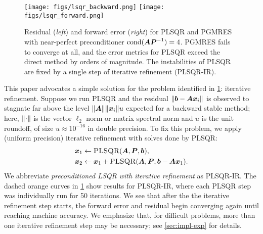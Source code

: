 \documentclass[onefignum,onetabnum,pagebackref,dvipsnames]{siamart220329}
\begin{document}
\begin{figure}[t]
    \centering
    \texttt{[image: figs/lsqr\_backward.png]}
    \texttt{[image: figs/lsqr\_forward.png]}
    \caption{Residual (\emph{left}) and forward error (\emph{right}) for PLSQR and PGMRES with near-perfect preconditioner $\operatorname{cond}(\boldsymbol{A}\boldsymbol{P}^{-1}) = 4$.
    PGMRES fails to converge at all, and the error metrics for PLSQR exceed the direct method by orders of magnitude.
    The instabilities of PLSQR are fixed by a single step of iterative refinement (PLSQR-IR).}
    \label{fig:lsqr}
\end{figure}

This paper advocates a simple solution for the problem identified in \cref{fig:lsqr}: iterative refinement.
Suppose we run PLSQR and the residual $\norm{\vec{b} - \mat{A}\vec{x}_i}$ is observed to stagnate far above the level $\norm{\mat{A}}\norm{\vec{x}_i} u$ expected for a backward stable method; here, $\norm{\cdot}$ is the vector $\ell_2$ norm or matrix spectral norm and $u$ is the unit roundoff, of size $u\approx 10^{-16}$ in double precision.
To fix this problem, we apply (uniform precision) iterative refinement with solves done by PLSQR:
%
\begin{equation} \label{eq:PLSQR-IR}
    \begin{split}
    \vec{x}_1 &\gets \Call{PLSQR}{\mat{A},\mat{P},\vec{b}}, \\
    \vec{x}_2 &\gets \vec{x}_1+\Call{PLSQR}{\mat{A},\mat{P},\vec{b}-\mat{A}\vec{x}_1}.
    \end{split}
\end{equation}
%
We abbreviate \emph{preconditioned LSQR with iterative refinement} as PLSQR-IR.
The dashed orange curves in \cref{fig:lsqr} show results for PLSQR-IR, where each PLSQR step was individually run for 50 iterations.
We see that after the the iterative refinement step starts, the forward error and residual begin converging again until reaching machine accuracy.
We emphasize that, for difficult problems, more than one iterative refinement step may be necessary; see \cref{sec:impl-exp} for details.
\end{document}
